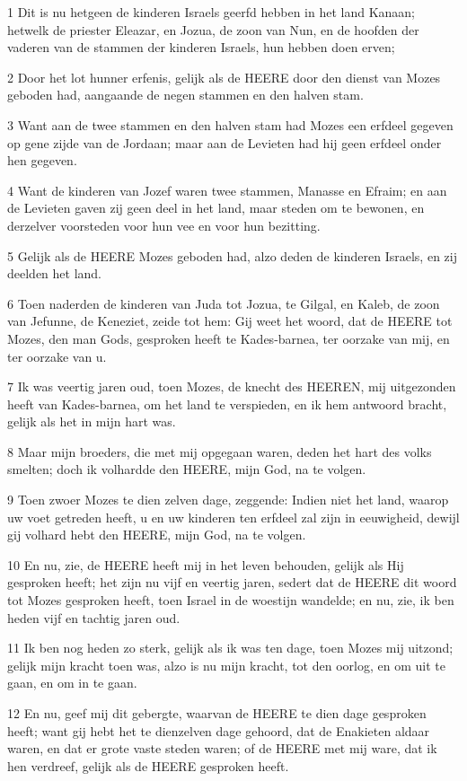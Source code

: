 \par 1 Dit is nu hetgeen de kinderen Israels geerfd hebben in het land Kanaan; hetwelk de priester Eleazar, en Jozua, de zoon van Nun, en de hoofden der vaderen van de stammen der kinderen Israels, hun hebben doen erven;
\par 2 Door het lot hunner erfenis, gelijk als de HEERE door den dienst van Mozes geboden had, aangaande de negen stammen en den halven stam.
\par 3 Want aan de twee stammen en den halven stam had Mozes een erfdeel gegeven op gene zijde van de Jordaan; maar aan de Levieten had hij geen erfdeel onder hen gegeven.
\par 4 Want de kinderen van Jozef waren twee stammen, Manasse en Efraim; en aan de Levieten gaven zij geen deel in het land, maar steden om te bewonen, en derzelver voorsteden voor hun vee en voor hun bezitting.
\par 5 Gelijk als de HEERE Mozes geboden had, alzo deden de kinderen Israels, en zij deelden het land.
\par 6 Toen naderden de kinderen van Juda tot Jozua, te Gilgal, en Kaleb, de zoon van Jefunne, de Keneziet, zeide tot hem: Gij weet het woord, dat de HEERE tot Mozes, den man Gods, gesproken heeft te Kades-barnea, ter oorzake van mij, en ter oorzake van u.
\par 7 Ik was veertig jaren oud, toen Mozes, de knecht des HEEREN, mij uitgezonden heeft van Kades-barnea, om het land te verspieden, en ik hem antwoord bracht, gelijk als het in mijn hart was.
\par 8 Maar mijn broeders, die met mij opgegaan waren, deden het hart des volks smelten; doch ik volhardde den HEERE, mijn God, na te volgen.
\par 9 Toen zwoer Mozes te dien zelven dage, zeggende: Indien niet het land, waarop uw voet getreden heeft, u en uw kinderen ten erfdeel zal zijn in eeuwigheid, dewijl gij volhard hebt den HEERE, mijn God, na te volgen.
\par 10 En nu, zie, de HEERE heeft mij in het leven behouden, gelijk als Hij gesproken heeft; het zijn nu vijf en veertig jaren, sedert dat de HEERE dit woord tot Mozes gesproken heeft, toen Israel in de woestijn wandelde; en nu, zie, ik ben heden vijf en tachtig jaren oud.
\par 11 Ik ben nog heden zo sterk, gelijk als ik was ten dage, toen Mozes mij uitzond; gelijk mijn kracht toen was, alzo is nu mijn kracht, tot den oorlog, en om uit te gaan, en om in te gaan.
\par 12 En nu, geef mij dit gebergte, waarvan de HEERE te dien dage gesproken heeft; want gij hebt het te dienzelven dage gehoord, dat de Enakieten aldaar waren, en dat er grote vaste steden waren; of de HEERE met mij ware, dat ik hen verdreef, gelijk als de HEERE gesproken heeft.
